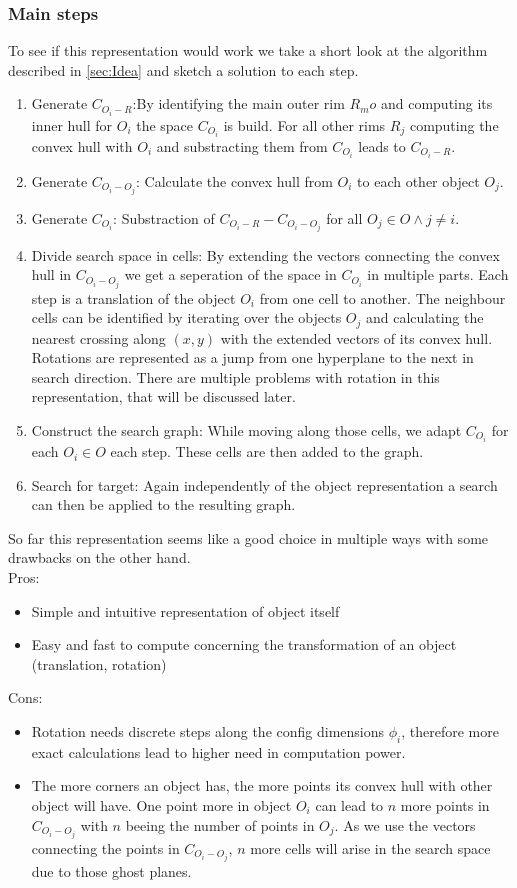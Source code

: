\subsubsection{Main steps}
To see if this representation would work we take a short look at the algorithm described in \ref{sec:Idea} and sketch a solution to each step.
\begin{enumerate}
\item Generate $C_{O_i-R}$:By identifying the main outer rim $R_mo$ and computing its inner hull for $O_i$ the space $C_{O_i}$ is build. For all other rims $R_j$ computing the convex hull with $O_i$ and substracting them from $C_{O_i}$ leads to $C_{O_i-R}$.
\item Generate $C_{O_i-O_j}$: Calculate the convex hull from $O_i$ to each other object $O_j$.
\item Generate $C_{O_i}$: Substraction of $C_{O_i-R} - C_{O_i-O_j}$ for all $O_j \in O \wedge j \neq i$.
\item Divide search space in cells: By extending the vectors connecting the convex hull in $C_{O_i-O_j}$ we get a seperation of the space in $C_{O_i}$ in multiple parts. Each step is a translation of the object $O_i$  from one cell to another. The neighbour cells can be identified by iterating over the objects $O_j$ and calculating the nearest crossing along $(x,y)$ with the extended vectors of its convex hull. \\ Rotations are represented as a jump from one hyperplane to the next in search direction. There are multiple problems with rotation in this representation, that will be discussed later.
\item Construct the search graph: While moving along those cells, we adapt $C_{O_i}$ for each $O_i \in O$ each step. These cells are then added to the graph.
\item Search for target: Again independently of the object representation a search can then be applied to the resulting graph. 
\end{enumerate}


So far this representation seems like a good choice in multiple ways with some drawbacks on the other hand.\\
Pros:
\begin{itemize}
\item Simple and intuitive representation of object itself
\item Easy and fast to compute concerning the transformation of an object (translation, rotation)
\end{itemize}
Cons:
\begin{itemize}
\item Rotation needs discrete steps along the config dimensions $\phi_i$, therefore more exact calculations lead to higher need in computation power.
\item The more corners an object has, the more points its convex hull with other object will have. One point more in object $O_i$ can lead to $n$ more points in $C_{O_i-O_j}$ with $n$ beeing the number of points in $O_j$. As we use the vectors connecting the points in $C_{O_i-O_j}$, $n$ more cells will arise in the search space due to those ghost planes.
\end{itemize}

